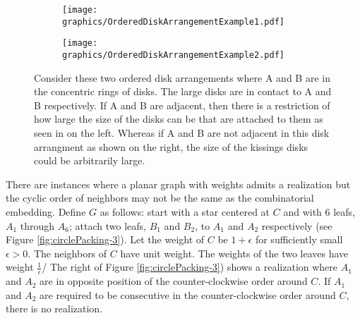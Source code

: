 \documentclass[10pt]{CSUNthesis}
\theoremstyle{plain}%
\theoremstyle{definition}
\theoremstyle{remark}
\begin{document}
\begin{figure}[!htbp]\label{fig:circlePacking-3}
\begin{center}
  \begin{subfigure}[b]{.48\textwidth}
  \begin{center}
	  \texttt{[image: graphics/OrderedDiskArrangementExample1.pdf]}
	  \label{fig:circlePacking3-1}
	  \end{center}
  \end{subfigure}
  \begin{subfigure}[b]{0.48\textwidth}
  \begin{center}
	  \texttt{[image: graphics/OrderedDiskArrangementExample2.pdf]}	  
	  \label{fig:circlePacking3-2}
	  \end{center}
  \end{subfigure}
  \caption{Consider these two ordered disk arrangements where A and B are in the concentric rings of disks.  The large disks are in contact to A and B respectively.  
  If A and B are adjacent, then there is a restriction of how large the size of the disks can be that are attached to them as seen in on the left.  
  Whereas if A and B are not adjacent in this disk arrangment as shown on the right, the size of the kissings disks could be arbitrarily large.}
\end{center} 
\end{figure}

There are instances where a planar graph with weights admits a realization but the cyclic order of neighbors may not be the same as the combinatorial embedding.
Define $G$ as follows: start with a star centered at $C$ and with 6 leafs, $A_1$ through $A_6$; attach two leafs, $B_1$ and $B_2$, to $A_1$ and  $A_2$ respectively (see  Figure \ref{fig:circlePacking-3}).
Let the weight of $C$ be $1+\epsilon$ for sufficiently small $\epsilon > 0$.
The neighbors of $C$ have unit weight.
The weights of the two leaves have weight $\frac{1}{\epsilon}$/
The right of Figure \ref{fig:circlePacking-3}) shows a realization where $A_1$ and $A_2$ are in opposite position of the counter-clockwise order around $C$.
If $A_1$ and $A_2$ are required to be consecutive in the counter-clockwise order around $C$, there is no realization.
\end{document}
